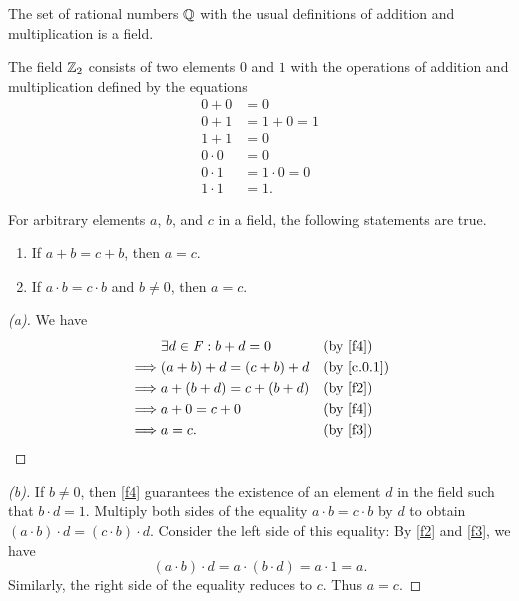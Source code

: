 \begin{eg}\label{c.0.3}
	The set of rational numbers \(\mathbb{Q}\) with the usual definitions of addition and multiplication is a field.
\end{eg}

\begin{eg}\label{c.0.4}
	The field \(\mathbb{Z}_2\) consists of two elements \(0\) and \(1\) with the operations of addition and multiplication defined by the equations
	\begin{align*}
		0 + 0     & = 0             \\
		0 + 1     & = 1 + 0 = 1     \\
		1 + 1     & = 0             \\
		0 \cdot 0 & = 0             \\
		0 \cdot 1 & = 1 \cdot 0 = 0 \\
		1 \cdot 1 & = 1.
	\end{align*}
\end{eg}

\begin{thm}\label{c.1}
	For arbitrary elements \(a\), \(b\), and \(c\) in a field, the following statements are true.
	\begin{enumerate}
		\item If \(a + b = c + b\), then \(a = c\).
		\item If \(a \cdot b = c \cdot b\) and \(b \neq 0\), then \(a = c\).
	\end{enumerate}
\end{thm}

\begin{proof}[(a)]
	We have
	\begin{align*}
		         & \exists d \in \F : b + d = 0 &  & \text{(by \ref{f4})} \\
		\implies & (a + b) + d = (c + b) + d    &  & \by{c.0.1}           \\
		\implies & a + (b + d) = c + (b + d)    &  & \text{(by \ref{f2})} \\
		\implies & a + 0 = c + 0                &  & \text{(by \ref{f4})} \\
		\implies & a = c.                       &  & \text{(by \ref{f3})}
	\end{align*}
\end{proof}

\begin{proof}[(b)]
	If \(b \neq 0\), then \ref{f4} guarantees the existence of an element \(d\) in the field such that \(b \cdot d = 1\).
	Multiply both sides of the equality \(a \cdot b = c \cdot b\) by \(d\) to obtain \((a \cdot b) \cdot d = (c \cdot b) \cdot d\).
	Consider the left side of this equality:
	By \ref{f2} and \ref{f3}, we have
	\[
		(a \cdot b) \cdot d = a \cdot (b \cdot d) = a \cdot 1 = a.
	\]
	Similarly, the right side of the equality reduces to \(c\).
	Thus \(a = c\).
\end{proof}

